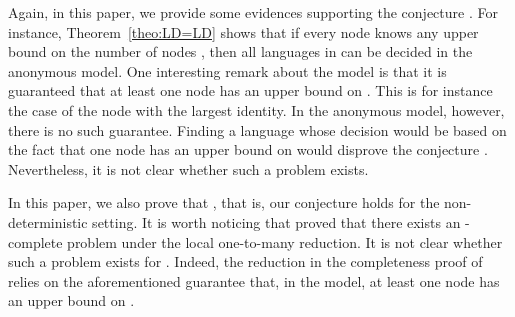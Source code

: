\documentclass{llncs}
\begin{document}
Again, in this paper, we provide some evidences supporting the conjecture . For instance, Theorem~\ref{theo:LD=LD} shows that if every node knows any upper bound on the number of nodes , then all languages in  can be decided in the anonymous  model. One interesting remark about the  model is that it is guaranteed that at least one node has an upper bound on . This is for instance the case of the node with the largest identity. In the anonymous  model, however, there is no such guarantee. Finding a language whose decision would be based on the fact that one node has an upper bound on  would disprove the conjecture  . Nevertheless, it is not clear whether such a problem exists. 

In this paper, we also prove that , that is, our conjecture holds for the non-deterministic setting. It is worth noticing that \cite{FKP11} proved that there exists an -complete problem under the local one-to-many reduction. It is not clear whether such a problem exists for . Indeed, the reduction in the completeness proof of \cite{FKP11} relies on the aforementioned guarantee that, in the  model,  at least one node has an upper bound on . 
\end{document}
